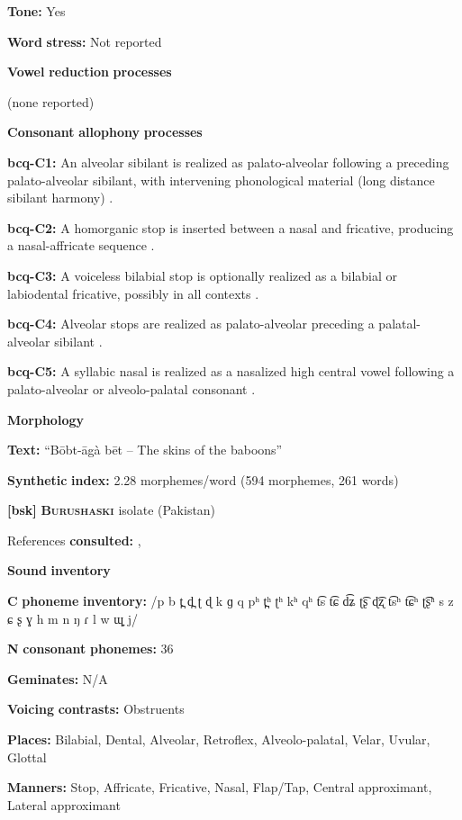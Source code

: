 \begin{styleBody}
\textbf{Tone:} Yes

\textbf{Word} \textbf{stress:} Not reported

\textbf{Vowel} \textbf{reduction} \textbf{processes}

(none reported)

\textbf{Consonant} \textbf{allophony} \textbf{processes}

\textbf{bcq-C1:} An alveolar sibilant is realized as palato-alveolar following a preceding palato-alveolar sibilant, with intervening phonological material (long distance sibilant harmony) \citep[67]{Rapold2006}.

\textbf{bcq-C2:} A homorganic stop is inserted between a nasal and fricative, producing a nasal-affricate sequence \citep[69]{Rapold2006}.

\textbf{bcq-C3:} A voiceless bilabial stop is optionally realized as a bilabial or labiodental fricative, possibly in all contexts \citep[73]{Rapold2006}.

\textbf{bcq-C4:} Alveolar stops are realized as palato-alveolar preceding a palatal-alveolar sibilant \citep[74]{Rapold2006}.

\textbf{bcq-C5:} A syllabic nasal is realized as a nasalized high central vowel following a palato-alveolar or alveolo-palatal consonant \citep[76]{Rapold2006}.

\textbf{Morphology}

\textbf{Text:} “Bōbt-āgà bēt -- The skins of the baboons” \citep[594-599]{Rapold2006}

\textbf{Synthetic} \textbf{index:} 2.28 morphemes/word (594 morphemes, 261 words)

\textbf{[bsk]}   \textbf{\textsc{Burushaski}}  isolate (Pakistan)

References \textbf{consulted:} \citet{Anderson1997}, \citet{Yoshioka2012}

\textbf{Sound} \textbf{inventory}

\textbf{C} \textbf{phoneme} \textbf{inventory:} /p b t̪ d̪ ʈ ɖ k ɡ q pʰ t̪ʰ ʈʰ kʰ qʰ t͡s t͡ɕ d͡ʑ ʈ͡ʂ ɖ͡ʐ t͡sʰ t͡ɕʰ ʈ͡ʂʰ s z ɕ ʂ ɣ h m n ŋ ɾ l w ɰ̟ j/

\textbf{N} \textbf{consonant} \textbf{phonemes:} 36

\textbf{Geminates:} N/A

\textbf{Voicing} \textbf{contrasts:} Obstruents

\textbf{Places:} Bilabial, Dental, Alveolar, Retroflex, Alveolo-palatal, Velar, Uvular, Glottal

\textbf{Manners:} Stop, Affricate, Fricative, Nasal, Flap/Tap, Central approximant, Lateral approximant


\end{styleBody}
